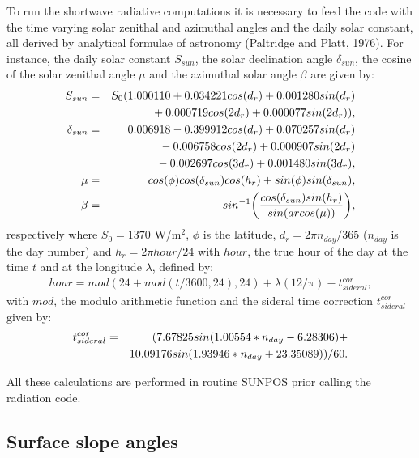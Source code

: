 To run the shortwave radiative computations it is necessary to feed the code
with the time varying solar zenithal and azimuthal angles and
the daily solar constant, all derived by analytical formulae of astronomy
(Paltridge and Platt, 1976).
For instance, the daily solar constant $S_{sun}$, the solar declination angle
$\delta_{sun}$, the cosine of the solar zenithal angle $\mu$ and the azimuthal
solar angle $\beta$ are given by:
\begin{eqnarray}
S_{sun} &=& S_0(1.000110+0.034221cos(d_r)+0.001280sin(d_r) \cr
        & &              \mbox{} +0.000719cos(2d_r)+0.000077sin(2d_r)), \\
\delta_{sun} &=& 0.006918-0.399912 cos(d_r)+0.070257 sin(d_r) \cr
             & &          \mbox{} -0.006758 cos(2d_r)+0.000907 sin(2d_r) \cr
             & &          \mbox{} -0.002697cos(3d_r)+0.001480sin(3d_r), \\
\mu &=& cos(\phi)cos(\delta_{sun})cos(h_r)+sin(\phi)sin(\delta_{sun}), \\
\beta &=& sin^{-1}\displaystyle{\biggl(
        \displaystyle{cos(\delta_{sun}) sin(h_r) \over sin(arcos(\mu))}
                                \biggr)},
\end{eqnarray}
respectively where $S_0=1370$ W/m$^2$, $\phi$ is the latitude,
$d_r=2\pi n_{day}/365$ ($n_{day}$ is the day number) and
$h_r=2\pi {hour}/24$ with ${hour}$, the true hour of the day at the time $t$
and at the longitude $\lambda$, defined by:
\begin{eqnarray}
{hour} = mod(24+mod(t/3600,24),24) + \lambda (12/\pi) - t_{sideral}^{cor},
\end{eqnarray}
with $mod$, the modulo arithmetic function and the sideral time correction
$t_{sideral}^{cor}$ given by:
\begin{eqnarray}
t_{sideral}^{cor} &=& (7.67825 sin(1.00554*n_{day}-6.28306) + \cr
        & &              \mbox{} 10.09176 sin(1.93946*n_{day}+23.35089))/60.
\end{eqnarray}

\noindent All these calculations are performed in routine SUNPOS prior calling
the radiation code.

%
\subsection{Surface slope angles}
%

